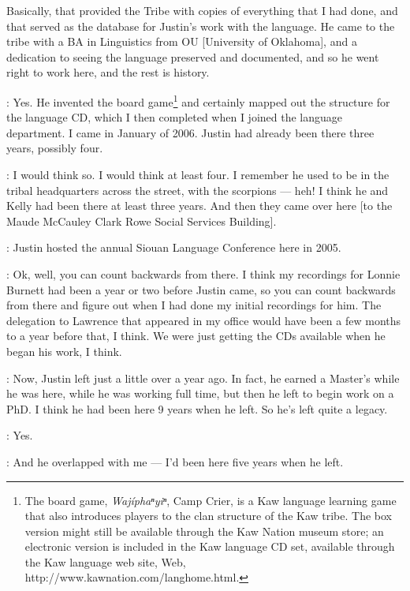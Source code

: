 \documentclass[output=paper]{LSP/langsci}
\begin{document}
Basically, that provided the Tribe with copies of everything that I had done, and that served as the database for Justin's work with the language. He came to the tribe with a BA in Linguistics from OU [University of Oklahoma], and a dedication to seeing the language preserved and documented, and so he went right to work here, and the rest is history.

 
: Yes. He invented the board game\footnote{The board game, \textit{Waj\'iphaⁿyiⁿ}, Camp Crier, is a Kaw language learning game that also introduces players to the clan structure of the Kaw tribe. The box version might still be available through the Kaw Nation museum store; an electronic version is included in the Kaw language CD set, available through the Kaw language web site, Web, {http://www.kawnation.com/langhome.html}.} and certainly mapped out the structure for the language CD, which I then completed when I joined the language department. I came in January of 2006. Justin had already been there three years, possibly four.
 

: I would think so. I would think at least four. I remember he used to be in the tribal headquarters across the street, with the scorpions --- heh! I think he and Kelly had been there at least three years. And then they came over here [to the Maude McCauley Clark Rowe Social Services Building].

: Justin hosted the annual Siouan Language Conference here in 2005. 

: Ok, well, you can count backwards from there. I think my recordings for Lonnie Burnett had been a year or two before Justin came, so you can count backwards from there and figure out when I had done my initial recordings for him. The delegation to Lawrence that appeared in my office would have been a few months to a year before that, I think. We were just getting the CDs available when he began his work, I think.

: Now, Justin left just a little over a year ago. In fact, he earned a Master's while he was here, while he was working full time, but then he left to begin work on a PhD. I think he had been here 9 years when he left. So he's left quite a legacy.

: Yes.

: And he overlapped with me --- I'd been here five years when he left.
\end{document}
